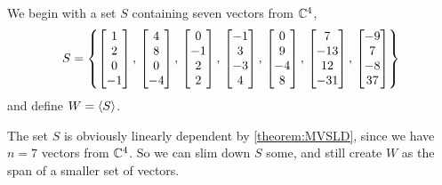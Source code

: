 \documentclass{ximera}
\begin{document}
\begin{example}
  We begin with a set $S$ containing seven vectors from $\mathbb{C}^{4}$,
  \[
    S=\left\{
      \begin{bmatrix}1\\2\\0\\-1\end{bmatrix},\,
      \begin{bmatrix}4\\8\\0\\-4\end{bmatrix},\,
      \begin{bmatrix}0\\-1\\2\\2\end{bmatrix},\,
      \begin{bmatrix}-1\\3\\-3\\4\end{bmatrix},\,
      \begin{bmatrix}0\\9\\-4\\8\end{bmatrix},\,
      \begin{bmatrix}7\\-13\\12\\-31\end{bmatrix},\,
      \begin{bmatrix}-9\\7\\-8\\37\end{bmatrix}
    \right\}
  \]
  and define $W=\left\langle S\right\rangle$.
  
  The set $S$ is obviously linearly dependent by \ref{theorem:MVSLD},
  since we have $n=7$ vectors from $\mathbb{C}^{4}$.  So we can slim down
  $S$ some, and still create $W$ as the span of a smaller set of
  vectors.


\end{example}
\end{document}
